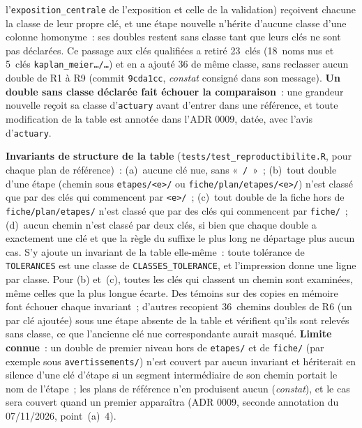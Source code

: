\documentclass[a4paper,11pt]{article}
\newcommand{\code}[1]{\texttt{\small #1}}
\begin{document}
l'\code{exposition\_centrale} de l'exposition et celle de la validation)
reçoivent chacune la classe de leur propre clé, et une étape nouvelle
n'hérite d'aucune classe d'une colonne homonyme~: ses doubles restent sans
classe tant que leurs clés ne sont pas déclarées. Ce passage aux clés
qualifiées a retiré 23~clés (18~noms nus et 5~clés
\code{kaplan\_meier\ldots/\ldots}) et en a ajouté 36 de même classe, sans
reclasser aucun double de R1 à R9 (commit \code{9cda1cc}, \emph{constat}
consigné dans son message). \textbf{Un double sans classe déclarée fait échouer la
comparaison}~: une grandeur nouvelle reçoit sa classe d'\code{actuary} avant
d'entrer dans une référence, et toute modification de la table est annotée
dans l'ADR 0009, datée, avec l'avis d'\code{actuary}.

\medskip
\noindent
\textbf{Invariants de structure de la table} (\code{tests/test\_reproductibilite.R},
pour chaque plan de référence)~: (a)~aucune clé nue, sans «~\code{/}~»~;
(b)~tout double d'une étape (chemin sous \code{etapes/<e>/} ou
\code{fiche/plan/etapes/<e>/}) n'est classé que par des clés qui commencent
par \code{<e>/}~; (c)~tout double de la fiche hors de
\code{fiche/plan/etapes/} n'est classé que par des clés qui commencent par
\code{fiche/}~; (d)~aucun chemin n'est classé par deux clés, si bien que
chaque double a exactement une clé et que la règle du suffixe le plus long
ne départage plus aucun cas. S'y ajoute un invariant de la table
elle-même~: toute tolérance de \code{TOLERANCES} est une classe de
\code{CLASSES\_TOLERANCE}, et l'impression donne une ligne par classe. Pour (b) et~(c), toutes les clés qui classent
un chemin sont examinées, même celles que la plus longue écarte. Des
témoins sur des copies en mémoire font échouer chaque invariant~; d'autres
recopient 36~chemins doubles de R6 (un par clé ajoutée) sous une étape
absente de la table et vérifient qu'ils sont relevés sans classe, ce que
l'ancienne clé nue correspondante aurait masqué. \textbf{Limite connue}~: un double
de premier niveau hors de \code{etapes/} et de \code{fiche/} (par exemple
sous \code{avertissements/}) n'est couvert par aucun invariant et
hériterait en silence d'une clé d'étape si un segment intermédiaire de son
chemin portait le nom de l'étape~; les plans de référence n'en
produisent aucun (\emph{constat}), et le cas sera couvert
quand un premier apparaîtra (ADR 0009, seconde annotation du 07/11/2026,
point~(a)~4).
\end{document}
